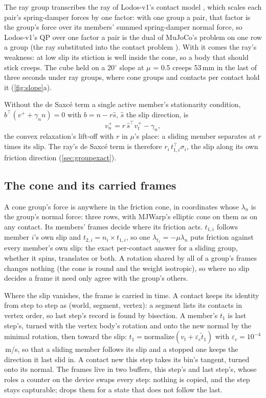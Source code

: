 The ray group transcribes the ray of Lodos-v1's contact model \cite{lodosv1}, which scales each pair's spring-damper forces by one factor: with one group a pair, that factor is the group's force over its members' summed spring-damper normal force, so Lodos-v1's QP over one factor a pair is the dual of MuJoCo's problem on one row a group (the ray substituted into the contact problem \cite{lodosv2}). With it comes the ray's weakness: at low slip its stiction is well inside the cone, so a body that should stick creeps. The cube held on a 20$^\circ$ slope at $\mu$ = 0.5 creeps 53\,mm in the last of three seconds under ray groups, where cone groups and contacts per contact hold it (\cref{fig:slope}a).

Without the de Saxc\'e term a single active member's stationarity condition, $b^\top(v^+ + \gamma_n n) = 0$ with $b = n - r\hat s$, $\hat s$ the slip direction, is
\begin{equation}\label{eq:raylift}
v^+_n = r\, \hat s^\top v^+_t - \gamma_n ,
\end{equation}
the convex relaxation's lift-off with $r$ in $\mu$'s place: a sliding member separates at $r$ times its slip. The ray's de Saxc\'e term is therefore $r_i\, t_{1,i}^\top \sigma_i$, the slip along its own friction direction (\cref{sec:groupexact}).

\subsection{The cone and its carried frames}\label{sec:cone}

A cone group's force is anywhere in the friction cone, in coordinates whose $\lambda_n$ is the group's normal force: three rows, with MJWarp's elliptic cone on them as on any contact. Its members' frames decide where its friction acts. $t_{1,i}$ follows member $i$'s own slip and $t_{2,i} = n_i \times t_{1,i}$, so one $\lambda_{t_1} = -\mu\lambda_n$ puts friction against every member's own slip: the exact per-contact answer for a sliding group, whether it spins, translates or both. A rotation shared by all of a group's frames changes nothing (the cone is round and the weight isotropic), so where no slip decides a frame it need only agree with the group's others.

Where the slip vanishes, the frame is carried in time. A contact keeps its identity from step to step as (world, segment, vertex): a segment lists its contacts in vertex order, so last step's record is found by bisection. A member's $t_1$ is last step's, turned with the vertex body's rotation and onto the new normal by the minimal rotation, then toward the slip: $t_1 = \mathrm{normalize}(v_t + \varepsilon_c \tilde t_1)$ with $\varepsilon_c = 10^{-4}$\,m/s, so that a sliding member follows its slip and a stopped one keeps the direction it last slid in. A contact new this step takes its bin's tangent, turned onto its normal. The frames live in two buffers, this step's and last step's, whose roles a counter on the device swaps every step: nothing is copied, and the step stays capturable;  drops them for a state that does not follow the last.

